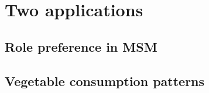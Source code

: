 \chapter{Two applications}
\label{cap:application}

\section{Role preference in MSM}
\label{sec:sexmsm}

\section{Vegetable consumption patterns}
\label{sec:veggies}
